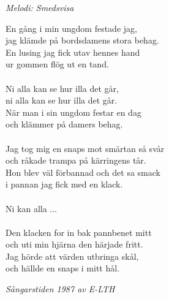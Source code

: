 {\footnotesize\textit{Melodi: Smedsvisa}}\par
\vspace{10pt}
En gång i min ungdom festade jag,\\
jag klämde på bordsdamens stora behag.\\
En lusing jag fick utav hennes hand\\
ur gommen flög ut en tand.\\
\\
Ni alla kan se hur illa det går,\\
ni alla kan se hur illa det går.\\
När man i sin ungdom festar en dag\\
och klämmer på damers behag.\\
\\
Jag tog mig en snaps mot smärtan så svår\\
och råkade trampa på kärringens tår.\\
Hon blev väl förbannad och det sa smack\\
i pannan jag fick med en klack.\\
\\
Ni kan alla ...\\
\\
Den klacken for in bak pannbenet mitt\\
och uti min hjärna den härjade fritt.\\
Jag hörde att värden utbringa skål,\\
och hällde en snaps i mitt hål.
\par
\vspace{10pt}
{\footnotesize\textit{Sångarstiden 1987 av E-LTH}}
